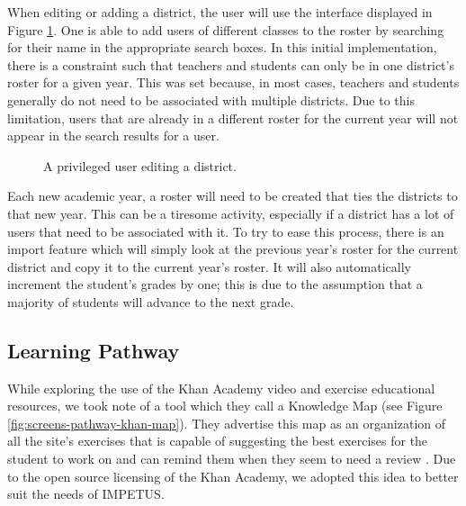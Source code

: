 When editing or adding a district, the user will use the interface displayed in Figure \ref{fig:screens-district-edit}. One is able to add users of different classes to the roster by searching for their name in the appropriate search boxes. In this initial implementation, there is a constraint such that teachers and students can only be in one district's roster for a given year. This was set because, in most cases, teachers and students generally do not need to be associated with multiple districts. Due to this limitation, users that are already in a different roster for the current year will not appear in the search results for a user.

\begin{figure}[h!]
	\centering
	\caption{A privileged user editing a district.}
	\label{fig:screens-district-edit}
\end{figure}

Each new academic year, a roster will need to be created that ties the districts to that new year. This can be a tiresome activity, especially if a district has a lot of users that need to be associated with it. To try to ease this process, there is an import feature which will simply look at the previous year's roster for the current district and copy it to the current year's roster. It will also automatically increment the student's grades by one; this is due to the assumption that a majority of students will advance to the next grade.

\subsection{Learning Pathway}
\label{subsec:design-pathway}
While exploring the use of the Khan Academy video and exercise educational resources, we took note of a tool which they call a Knowledge Map (see Figure \ref{fig:screens-pathway-khan-map}). They advertise this map as an organization of all the site's exercises that is capable of suggesting the best exercises for the student to work on and can remind them when they seem to need a review \cite{khanacademy-about}. Due to the open source licensing of the Khan Academy, we adopted this idea to better suit the needs of IMPETUS.


